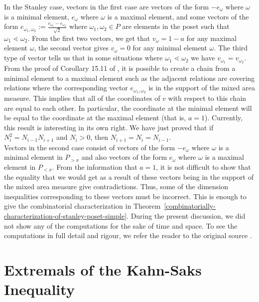 \documentclass{puthesis-UG}
\begin{document}
In the Stanley case, vectors in the first case are vectors of the form $-e_{\omega}$ where $\omega$ is a minimal element, $e_\omega$ where $\omega$ is a maximal element, and some vectors of the form $e_{\omega_1,\omega_2} := \frac{e_{\omega_1} - e_{\omega_2}}{\sqrt{2}}$ where $\omega_1, \omega_2 \in P$ are elements in the poset such that $\omega_1 \lessdot \omega_2$. From the first two vectors, we get that $v_\omega = 1-a$ for any maximal element $\omega$, the second vector gives $v_\omega = 0$ for any minimal element $\omega$. The third type of vector tells us that in some situations where $\omega_1 \lessdot \omega_2$ we have $v_{\omega_1} = v_{\omega_2}$. From the proof of Corollary 15.11 of \cite{shenfeld2022extremals}, it is possible to create a chain from a minimal element to a maximal element such as the adjacent relations are covering relations where the corresponding vector $e_{\omega_1, \omega_2}$ is in the support of the mixed area measure. This implies that all of the coordinates of $v$ with respect to this chain are equal to each other. In particular, the coordinate at the minimal element will be equal to the coordinate at the maximal element (that is, $a = 1$). Currently, this result is interesting in its own right. We have just proved that if $N_i^2 = N_{i-1} N_{i+1}$ and $N_i > 0$, then $N_{i+1} = N_i = N_{i-1}$. \\

Vectors in the second case consist of vectors of the form $-e_\omega$ where $\omega$ is a minimal element in $P_{> x}$ and also vectors of the form $e_\omega$ where $\omega$ is a maximal element in $P_{< x}$. From the information that $a = 1$, it is not difficult to show that the equality that we would get as a result of these vectors being in the support of the mixed area measure give contradictions. Thus, some of the dimension inequalities corresponding to these vectors must be incorrect. This is enough to give the combinatorial characterization in Theorem~\ref{combinatorially-characterization-of-stanley-poset-simple}. During the present discussion, we did not show any of the computations for the sake of time and space. To see the computations in full detail and rigour, we refer the reader to the original source \cite{shenfeld2022extremals}. 

\section{Extremals of the Kahn-Saks Inequality} \label{kahn-saks-inequality}
\end{document}
